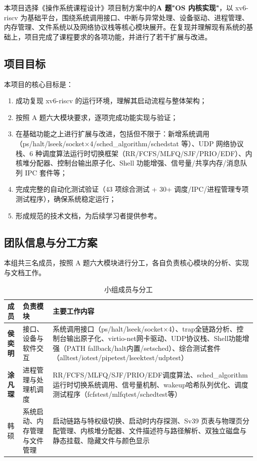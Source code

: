 \documentclass[12pt,a4paper]{ctexart}
\begin{document}
本项目选择《操作系统课程设计》项目制方案中的\textbf{A 题"OS 内核实现"}，以 xv6-riscv 为基础平台，围绕系统调用接口、中断与异常处理、设备驱动、进程管理、内存管理、文件系统以及网络协议栈等核心模块展开。在复现并理解现有系统的基础上，项目完成了课程要求的各项功能，并进行了若干扩展与改进。

\subsection{项目目标}

本项目的核心目标是：

\begin{enumerate}
  \item 成功复现 xv6-riscv 的运行环境，理解其启动流程与整体架构；
  \item 按照 A 题六大模块要求，逐项完成功能实现与验证；
  \item 在基础功能之上进行扩展与改进，包括但不限于：新增系统调用（ps/halt/lseek/socket×4/sched\_algorithm/schedstat 等）、UDP 网络协议栈、6 种调度算法运行时切换框架（RR/FCFS/MLFQ/SJF/PRIO/EDF）、内核堆分配器、控制台输出原子化、Shell 功能增强、信号量/共享内存/消息队列 IPC 套件等；
  \item 完成完整的自动化测试验证（43 项综合测试 + 30+ 调度/IPC/进程管理专项测试程序），确保系统稳定运行；
  \item 形成规范的技术文档，为后续学习者提供参考。
\end{enumerate}

\subsection{团队信息与分工方案}

本组共三名成员，按照 A 题六大模块进行分工，各自负责核心模块的分析、实现与文档工作。

\begin{table}[H]
\centering
\caption{小组成员与分工}
\begin{tabular}{>{\bfseries}p{2.5cm}p{4.5cm}p{6cm}}
\toprule
\textbf{成员} & \textbf{负责模块} & \textbf{主要工作内容} \\
\midrule
侯奕明 & 接口、设备与软件交互 & 系统调用接口（ps/halt/lseek/socket×4）、trap全链路分析、控制台输出原子化、virtio-net网卡驱动、UDP协议栈、Shell功能增强（PATH fallback/halt内置/setsched）、综合测试套件（alltest/iotest/pipetest/lseektest/udptest） \\
\hline
涂凡琛 & 进程管理与处理机调度 & RR/FCFS/MLFQ/SJF/PRIO/EDF调度算法、sched\_algorithm运行时切换系统调用、信号量机制、wakeup哈希队列优化、调度测试程序（fcfstest/mlfqtest/schedtest等） \\
\hline

韩硕 & 系统启动、内存管理与文件管理 & 启动链路与特权级切换、启动时内存探测、Sv39 页表与物理页分配管理、内核堆分配器、文件描述符与路径解析、双独立磁盘与静态挂载、隐藏文件与颜色显示 \\

\bottomrule
\end{tabular}
\end{table}
\end{document}
